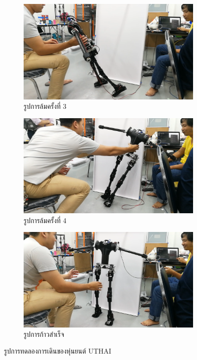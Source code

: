 \begin{figure}[!ht]
\begin{subfigure}[b]{0.4\linewidth}
    \end{subfigure}
    \begin{subfigure}[b]{0.4\linewidth}
      \includegraphics[width=\linewidth]{chapter4/images/fall3.png}
      \caption{รูปการล้มครั้งที่ 3}
    \end{subfigure}
    \begin{subfigure}[b]{0.4\linewidth}
      \includegraphics[width=\linewidth]{chapter4/images/fall4.png}
      \caption{รูปการล้มครั้งที่ 4}
    \end{subfigure}
    \begin{subfigure}[b]{0.4\linewidth}
      \includegraphics[width=\linewidth]{chapter4/images/achive1.png}
      \caption{รูปการก้าวสำเร็จ}
    \end{subfigure}
    \caption{รูปการทดลองการเดินของหุ่นยนต์ UTHAI}
    \label{fig:test_result}
  \end{figure}

